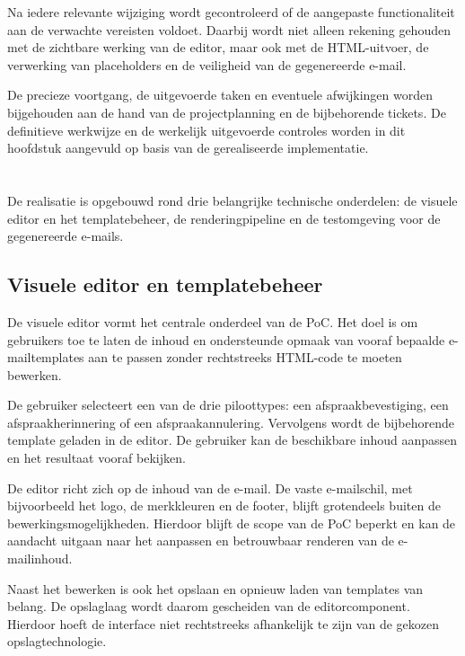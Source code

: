 Na iedere relevante wijziging wordt gecontroleerd of de aangepaste
functionaliteit aan de verwachte vereisten voldoet. Daarbij wordt niet alleen
rekening gehouden met de zichtbare werking van de editor, maar ook met de
HTML-uitvoer, de verwerking van placeholders en de veiligheid van de
gegenereerde e-mail.

De precieze voortgang, de uitgevoerde taken en eventuele afwijkingen worden
bijgehouden aan de hand van de projectplanning en de bijbehorende tickets.
De definitieve werkwijze en de werkelijk uitgevoerde controles worden in dit
hoofdstuk aangevuld op basis van de gerealiseerde implementatie.

\section{}%
\label{sec:onderdelen}
De realisatie is opgebouwd rond drie belangrijke technische onderdelen:
de visuele editor en het templatebeheer, de renderingpipeline en de
testomgeving voor de gegenereerde e-mails.

\subsection{Visuele editor en templatebeheer}
De visuele editor vormt het centrale onderdeel van de PoC. Het doel is om
gebruikers toe te laten de inhoud en ondersteunde opmaak van vooraf bepaalde
e-mailtemplates aan te passen zonder rechtstreeks HTML-code te moeten
bewerken.

De gebruiker selecteert een van de drie piloottypes: een
afspraakbevestiging, een afspraakherinnering of een afspraakannulering.
Vervolgens wordt de bijbehorende template geladen in de editor. De gebruiker
kan de beschikbare inhoud aanpassen en het resultaat vooraf bekijken.

De editor richt zich op de inhoud van de e-mail. De vaste e-mailschil, met
bijvoorbeeld het logo, de merkkleuren en de footer, blijft grotendeels
buiten de bewerkingsmogelijkheden. Hierdoor blijft de scope van de PoC
beperkt en kan de aandacht uitgaan naar het aanpassen en betrouwbaar
renderen van de e-mailinhoud.

Naast het bewerken is ook het opslaan en opnieuw laden van templates van
belang. De opslaglaag wordt daarom gescheiden van de editorcomponent.
Hierdoor hoeft de interface niet rechtstreeks afhankelijk te zijn van de
gekozen opslagtechnologie.

